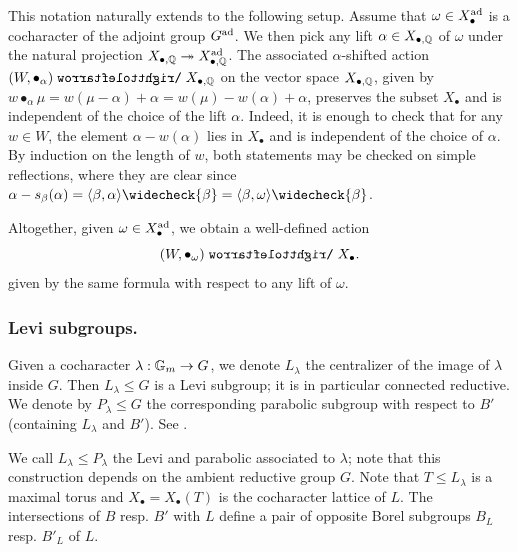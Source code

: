 This notation naturally extends to the following setup. Assume that $\omega \in X^{\operatorname{ad}}_{\bullet}$ is a cocharacter of the adjoint group $G^{\operatorname{ad}}$. We then pick any lift $\alpha \in X_{\bullet, \operatorname{\mathbb{Q}}}$ of $\omega$ under the natural projection $X_{\bullet, \operatorname{\mathbb{Q}}} \twoheadrightarrow X^{\operatorname{ad}}_{\bullet, \operatorname{\mathbb{Q}}}$. 
The associated $\alpha$-shifted action $(W, \bullet_{\alpha}) \acts X_{\bullet, \Q}$ on the vector space $X_{\bullet, \operatorname{\mathbb{Q}}}$, given by $w \bullet_{\alpha} \mu = w(\mu - \alpha) + \alpha = w(\mu) - w(\alpha) + \alpha$, preserves the subset $X_{\bullet}$ and is independent of the choice of the lift $\alpha$. 
%
Indeed, it is enough to check that for any $w \in W$, the element $\alpha - w(\alpha)$ lies in $X_{\bullet}$ and is independent of the choice of $\alpha$. By induction on the length of $w$, both statements may be checked on simple reflections, where they are clear since $\alpha - s_{\beta}(\alpha) = \langle \beta, \alpha \rangle \widecheck{\beta} = \langle \beta, \omega \rangle \widecheck{\beta}$.
%

Altogether, given $\omega \in X_{\bullet}^{\operatorname{ad}}$, we obtain a well-defined action
\begin{equation*}\label{equation: action shifted by adjoint cocharacter}
    (W, \bullet_{\omega}) \acts X_{\bullet}. 
\end{equation*}
given by the same formula with respect to any lift of $\omega$.



\subsubsection{Levi subgroups.}\label{section: levi subgroups}
Given a cocharacter $\lambda: \mathbb{G}_m \to G$, we denote
$L_{\lambda}$ the centralizer of the image of $\lambda$ inside $G$. 
Then $L_{\lambda} \leq G$ is a Levi subgroup; it is in particular connected reductive. We denote by $P_{\lambda} \leq G$ the corresponding parabolic subgroup with respect to $B'$ (containing $L_{\lambda}$ and $B'$). See \cite[\S 21.i and Theorem 13.33]{Mil17}.

We call $L_{\lambda} \leq P_{\lambda}$ the Levi and parabolic associated to $\lambda$; note that this construction depends on the ambient reductive group $G$. %
%
Note that $T \leq L_{\lambda}$ is a maximal torus and $X_{\bullet} = X_{\bullet}(T)$ is the cocharacter lattice of $L$. The intersections of $B$ resp. $B'$ with $L$ define a pair of opposite Borel subgroups $B_L$ resp. $B'_L$ of $L$. 

